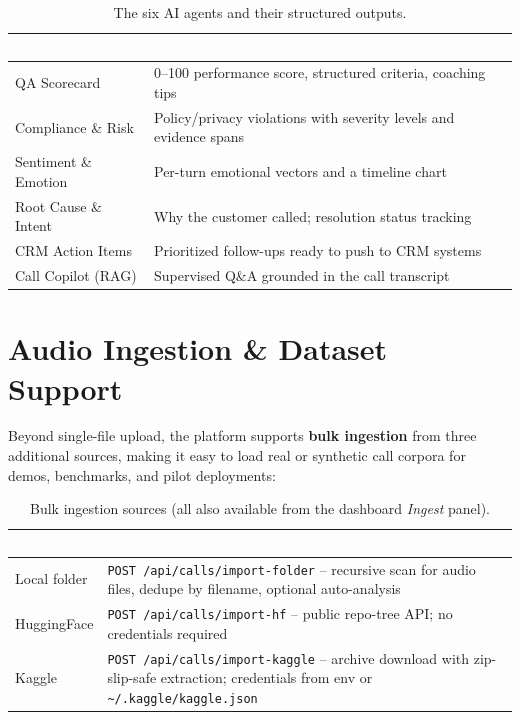 \documentclass[11pt,a4paper]{article}
\begin{document}
\begin{table}[htbp]
  \centering
  \small
  \begin{tabular}{@{}p{36mm}p{110mm}@{}}
    \toprule
    \rowcolor{tablehead}
    \textcolor{white}{\textbf{Agent}} & \textcolor{white}{\textbf{Output}} \\
    \midrule
    QA Scorecard & 0--100 performance score, structured criteria, coaching tips \\
    Compliance \& Risk & Policy/privacy violations with severity levels and evidence spans \\
    Sentiment \& Emotion & Per-turn emotional vectors and a timeline chart \\
    Root Cause \& Intent & Why the customer called; resolution status tracking \\
    CRM Action Items & Prioritized follow-ups ready to push to CRM systems \\
    Call Copilot (RAG) & Supervised Q\&A grounded in the call transcript \\
    \bottomrule
  \end{tabular}
  \caption{The six AI agents and their structured outputs.}
\end{table}

\section{Audio Ingestion \& Dataset Support}

Beyond single-file upload, the platform supports \textbf{bulk ingestion} from three
additional sources, making it easy to load real or synthetic call corpora for demos,
benchmarks, and pilot deployments:

\begin{table}[htbp]
  \centering
  \small
  \begin{tabular}{@{}p{34mm}p{112mm}@{}}
    \toprule
    \rowcolor{tablehead}
    \textcolor{white}{\textbf{Source}} & \textcolor{white}{\textbf{How it works}} \\
    \midrule
    Local folder & \texttt{POST /api/calls/import-folder} -- recursive scan for audio files, dedupe by filename, optional auto-analysis \\
    HuggingFace & \texttt{POST /api/calls/import-hf} -- public repo-tree API; no credentials required \\
    Kaggle & \texttt{POST /api/calls/import-kaggle} -- archive download with zip-slip-safe extraction; credentials from env or \texttt{\textasciitilde/.kaggle/kaggle.json} \\
    \bottomrule
  \end{tabular}
  \caption{Bulk ingestion sources (all also available from the dashboard \emph{Ingest} panel).}
\end{table}
\end{document}
